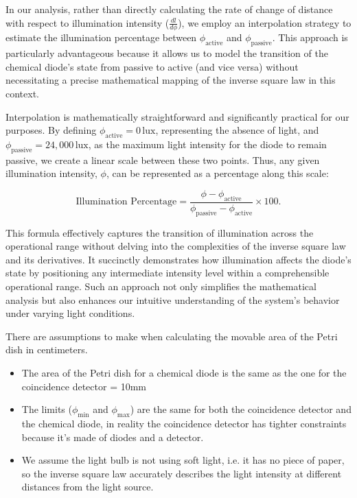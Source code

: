 \begin{tcolorbox}[colback=red!5!white,colframe=blue!75!black,title=Assumptions for mapping light intensity to radial distance]
    In our analysis, rather than directly calculating the rate of change of distance with respect to illumination intensity (\(\frac{dl}{d\phi}\)), we employ an interpolation strategy to estimate the illumination percentage between \(\phi_{\text{active}}\) and \(\phi_{\text{passive}}\). This approach is particularly advantageous because it allows us to model the transition of the chemical diode's state from passive to active (and vice versa) without necessitating a precise mathematical mapping of the inverse square law in this context. 

    Interpolation is mathematically straightforward and significantly practical for our purposes. By defining \(\phi_{\text{active}} = 0\,\text{lux}\), representing the absence of light, and \(\phi_{\text{passive}} = 24,000\,\text{lux}\), as the maximum light intensity for the diode to remain passive, we create a linear scale between these two points. Thus, any given illumination intensity, \(\phi\), can be represented as a percentage along this scale:
    
    \[
    \text{Illumination Percentage} = \frac{\phi - \phi_{\text{active}}}{\phi_{\text{passive}} - \phi_{\text{active}}} \times 100.
    \]
    
    This formula effectively captures the transition of illumination across the operational range without delving into the complexities of the inverse square law and its derivatives. It succinctly demonstrates how illumination affects the diode's state by positioning any intermediate intensity level within a comprehensible operational range. Such an approach not only simplifies the mathematical analysis but also enhances our intuitive understanding of the system's behavior under varying light conditions.
\end{tcolorbox}
\begin{tcolorbox}[colback=red!5!white,colframe=blue!75!black,title=Assumptions for Light Intensity Calculation]
    There are assumptions to make when calculating the movable area of the Petri dish in centimeters.
\begin{itemize}
    \item The area of the Petri dish for a chemical diode is the same as the one for the coincidence detector = 10mm
    \item The limits ($\phi_{\text{min}}$ and $\phi_{\text{max}}$) are the same for both the coincidence detector and the chemical diode, in reality the coincidence detector has tighter constraints because it's made of diodes and a detector.
    \item We assume the light bulb is not using soft light, i.e. it has no piece of paper, so the inverse square law accurately describes the light intensity at different distances from the light source. 
\end{itemize}
\end{tcolorbox}

